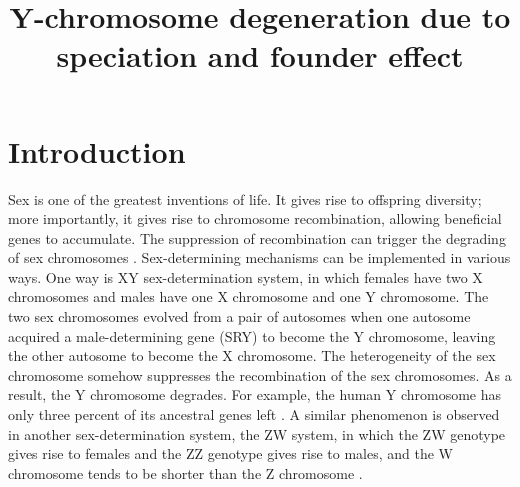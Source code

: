\documentclass[referee,sn-basic]{sn-jnl}%
\theoremstyle{thmstyleone}%
\theoremstyle{thmstyletwo}%
\theoremstyle{thmstylethree}%
\begin{document}
\title[Y-chromosome degeneration due to speciation and founder effect]{Y-chromosome degeneration due to speciation and founder effect}
\author[1]{ }

\author*[2]{ }




\maketitle

\section{Introduction}
Sex is one of the greatest inventions of life. It gives rise to offspring diversity; more importantly, it gives rise to chromosome recombination, allowing beneficial genes to accumulate. The suppression of recombination can trigger the degrading of sex chromosomes \citep{bachtrog2014sex,furman2020sex}.
Sex-determining mechanisms can be implemented in various ways. One way is XY sex-determination system, in which females have two X chromosomes and males have one X chromosome and one Y chromosome. The two sex chromosomes evolved from a pair of autosomes when one autosome acquired a male-determining gene (SRY) to become the Y chromosome, leaving the other autosome to become the X chromosome. The heterogeneity of the sex chromosome somehow suppresses the recombination of the sex chromosomes. As a result, the Y chromosome degrades. For example, the human Y chromosome has only three percent of its ancestral genes left \citep{skaletsky2003male}. A similar phenomenon is observed in another sex-determination system, the ZW system, in which the ZW genotype gives rise to females and the ZZ genotype gives rise to males, and the W chromosome tends to be shorter than the Z chromosome \citep{Zhou2014qi}.
\end{document}
